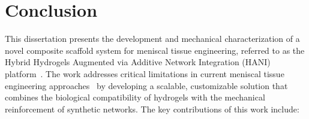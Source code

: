 \chapter{Conclusion}\label{chap:conclusion}

This dissertation presents the development and mechanical characterization of a novel composite scaffold system for meniscal tissue engineering, referred to as the Hybrid Hydrogels Augmented via Additive Network Integration (HANI) platform~\cite{elkommos2025hybridhydrogels}. The work addresses critical limitations in current meniscal tissue engineering approaches~\cite{makris2011kneemeniscus, gupta2020meniscaltissue} by developing a scalable, customizable solution that combines the biological compatibility of hydrogels with the mechanical reinforcement of synthetic networks. The key contributions of this work include:

